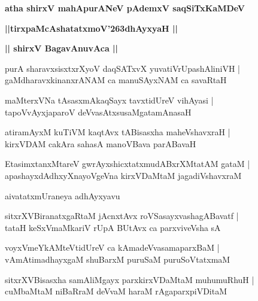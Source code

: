 \documentclass[twoside,12pt,openright]{book}
\def\S{\char'263}
\newcounter{shloka}[chapter]
\def\uvaca#1{\centerline{{\large\textbf{#1}}}}
\begin{document}
\begin{center}
{\LARGE\bfseries atha shirxV mahApurANeV pAdemxV saqSiTxKaMDeV}
\end{center}

\begin{center}
{\LARGE\bfseries ||tirxpaMcAshatatxmoV\S dhAyxyaH || }
\end{center}

\uvaca{|| shirxV BagavAnuvAca ||}

\begin{shloka}%
purA sharavxsisxtxrXyoV daqSATxvX yuvatiVrUpashAliniVH |\\
gaMdharavxkinanxrANAM ca manuSAyxNAM ca savaRtaH 
\end{shloka}

\begin{shloka}%
maMterxVNa tAsasxmAkaqSayx tavxtidUreV vihAyasi |\\
tapoVvAyxjaparoV deVvasAtxsusaMgatamAnasaH 
\end{shloka}

\begin{shloka}%
atiramAyxM kuTiVM kaqtAvx tABisasxha maheVshavxraH |\\
kirxVDAM cakAra sahasA manoVBava parABavaH 
\end{shloka}

\begin{shloka}%
EtasimxtanxMtareV gwrAyxshicxtatxmudABxrXMtatAM gataM |\\
apashayxdAdhxyXnayoVgeVna kirxVDaMtaM jagadiVshavxraM 
\end{shloka}

\begin{center}
aivatatxmUraneya adhAyxyavu
\end{center}

\begin{shloka}%
sitxrXVBiranatxgaRtaM jAcnxtAvx roVSasayxvashagABavatf |\\
tataH keSxVmaMkariV rUpA BUtAvx ca parxviveVsha sA 
\end{shloka}

\begin{shloka}%
voyxVmeYkAMteVtidUreV ca kAmadeVvasamaparxBaM |\\
vAmAtimadhayxgaM shuBarxM puruSaM puruSoVtatxmaM
\end{shloka}

\begin{shloka}%
sitxrXVBisasxha samAliMgayx parxkirxVDaMtaM muhumuRhuH |\\
cuMbaMtaM niBaRraM deVvaM haraM rAgaparxpiVDitaM 
\end{shloka}
\end{document}
